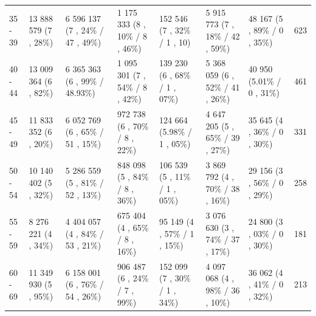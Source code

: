 \documentclass{article}
\begin{document}
\begin{tabular}{llllllll}
35 - 39 & 13 888 579 (7 , 28\%) & 6 596 137 (7 , 24\% / 47 , 49\%) & 1 175 333 (8 , 10\% / 8 , 46\%) & 152 546 (7 , 32\% / 1 , 10) & 5 915 773 (7 , 18\% / 42 , 59\%) & 48 167 (5 , 89\% / 0 , 35\%) & 623 \\
40 - 44 & 13 009 364 (6 , 82\%) & 6 365 363 (6 , 99\% / 48.93\%) & 1 095 301 (7 , 54\% / 8 , 42\%) & 139 230 (6 , 68\% / 1 , 07\%) & 5 368 059 (6 , 52\% / 41 , 26\%) & 40 950 (5.01\% / 0 , 31\%) & 461 \\
45 - 49 & 11 833 352 (6 , 20\%) & 6 052 769 (6 , 65\% / 51 , 15\%) & 972 738 (6 , 70\% / 8 , 22\%) & 124 664 (5.98\% / 1 , 05\%) & 4 647 205 (5 , 65\% / 39 , 27\%) & 35 645 (4 , 36\% / 0 , 30\%) & 331 \\
50 - 54 & 10 140 402 (5 , 32\%) & 5 286 559 (5 , 81\% / 52 , 13\%) & 848 098 (5 , 84\% / 8 , 36\%) & 106 539 (5 , 11\% / 1 , 05\%) & 3 869 792 (4 , 70\% / 38 , 16\%) & 29 156 (3 , 56\% / 0 , 29\%) & 258 \\
55 - 59 & 8 276 221 (4 , 34\%) & 4 404 057 (4 , 84\% / 53 , 21\%) & 675 404 (4 , 65\% / 8 , 16\%) & 95 149 (4 , 57\% / 1 , 15\%) & 3 076 630 (3 , 74\% / 37 , 17\%) & 24 800 (3 , 03\% / 0 , 30\%) & 181 \\
60 - 69 & 11 349 930 (5 , 95\%) & 6 158 001 (6 , 76\% / 54 , 26\%) & 906 487 (6 , 24\% / 7 , 99\%) & 152 099 (7 , 30\% / 1 , 34\%) & 4 097 068 (4 , 98\% / 36 , 10\%) & 36 062 (4 , 41\% / 0 , 32\%) & 213 \\
\bottomrule
\end{tabular}
\end{document}
